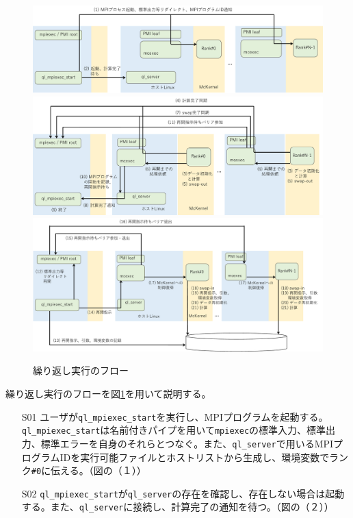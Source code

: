 \documentclass[twoside,11pt,fleqn]{book}
\begin{document}
{\begin{figure}[!t]
\centering
\includegraphics[width=0.95\linewidth]{figs/qlflowloop1.pdf}
\includegraphics[width=0.95\linewidth]{figs/qlflowloop2.pdf}
\includegraphics[width=0.95\linewidth]{figs/qlflowloop3.pdf}
\vspace{-0em}\caption{繰り返し実行のフロー}
\label{fig:qlflowloop}
\vspace{-0em}
\end{figure}
\FloatBarrier
%
繰り返し実行のフローを図\ref{fig:qlflowloop}を用いて説明する。
\begin{itemize}
\item[S01] ユーザが\texttt{ql\_mpiexec\_start}を実行し、MPIプログラムを起動する。\texttt{ql\_mpiexec\_start}は名前付きパイプを用いて\texttt{mpiexec}の標準入力、標準出力、標準エラーを自身のそれらとつなぐ。また、\texttt{ql\_server}で用いるMPIプログラムIDを実行可能ファイルとホストリストから生成し、環境変数でランク\texttt{\#0}に伝える。（図の（１））
\item[S02] \texttt{ql\_mpiexec\_start}が\texttt{ql\_server}の存在を確認し、存在しない場合は起動する。また、\texttt{ql\_server}に接続し、計算完了の通知を待つ。（図の（２））

\end{itemize}}
\end{document}
